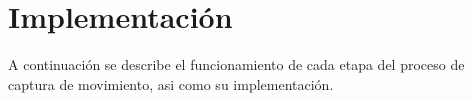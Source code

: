 \section{Implementación}\label{implementacionPosta}
A continuación se describe el funcionamiento de cada etapa del proceso de captura de movimiento, asi como su implementación.


\vspace{-0.8cm} %

